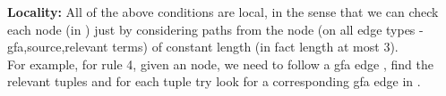 \noindent 
\textbf{Locality:}
All of the above conditions are local, in the sense that we can check each node (in ) 
just by considering paths from the node (on all edge types - gfa,source,relevant terms) of constant length (in fact length at most 3).\\
For example, for rule 4, given an  node, we need to follow a gfa edge , 
find the relevant tuples and for each tuple try look for a corresponding gfa edge  in .











